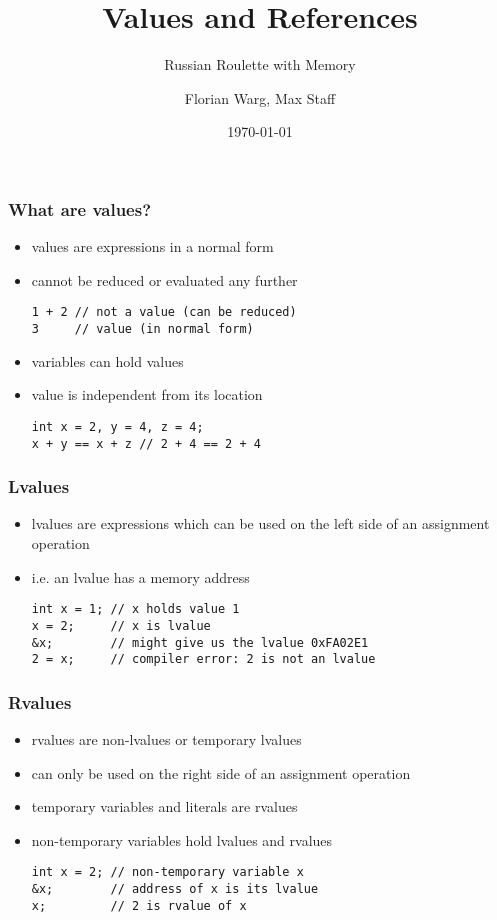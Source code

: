 



\title{Values and References}
\subtitle{Russian Roulette with Memory}
\date{\today}
\author{Florian Warg, Max Staff}

\maketitle

\begin{frame}[fragile]
    \frametitle{What are values?}
    \begin{itemize}
        \item values are expressions in a normal form
        \item cannot be reduced or evaluated any further
        \begin{lstlisting}[numbers=none]
1 + 2 // not a value (can be reduced)
3     // value (in normal form)
        \end{lstlisting}
        \item variables can hold values
        \item value is independent from its location
        \begin{lstlisting}[numbers=none]
int x = 2, y = 4, z = 4;
x + y == x + z // 2 + 4 == 2 + 4
        \end{lstlisting}
    \end{itemize}
\end{frame}

\begin{frame}[fragile]
    \frametitle{Lvalues}
    \begin{itemize}
        \item lvalues are expressions which can be used on the left side of an assignment operation
        \item i.e. an lvalue has a memory address
        \begin{lstlisting}[numbers=none]
int x = 1; // x holds value 1
x = 2;     // x is lvalue
&x;        // might give us the lvalue 0xFA02E1
2 = x;     // compiler error: 2 is not an lvalue
        \end{lstlisting}
    \end{itemize}
\end{frame}

\begin{frame}[fragile]
    \frametitle{Rvalues}
    \begin{itemize}
        \item rvalues are non-lvalues or temporary lvalues
        \item can only be used on the right side of an assignment operation
        \item temporary variables and literals are rvalues
        \item non-temporary variables hold lvalues and rvalues
        \begin{lstlisting}[numbers=none]
int x = 2; // non-temporary variable x
&x;        // address of x is its lvalue
x;         // 2 is rvalue of x
        \end{lstlisting}
    \end{itemize}
\end{frame}

